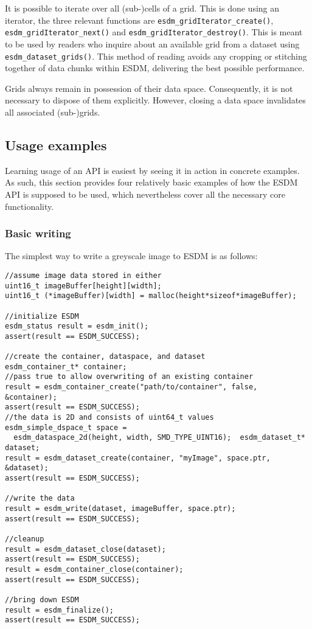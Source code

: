 It is possible to iterate over all (sub-)cells of a grid. 
This is done using an iterator, the three relevant functions are \lstinline|esdm_gridIterator_create()|, \lstinline|esdm_gridIterator_next()| and \lstinline|esdm_gridIterator_destroy()|. 
This is meant to be used by readers who inquire about an available grid from a dataset using \lstinline|esdm_dataset_grids()|. 
This method of reading avoids any cropping or stitching together of data chunks within ESDM, delivering the best possible performance.

Grids always remain in possession of their data space. 
Consequently, it is not necessary to dispose of them explicitly. 
However, closing a data space invalidates all associated (sub-)grids.

\subsection{Usage examples}%
\label{sec:user-guides:usage-example}
Learning usage of an API is easiest by seeing it in action in concrete examples. 
As such, this section provides four relatively basic examples of how the ESDM API is supposed to be used, which nevertheless cover all the necessary core functionality.

\subsubsection{Basic writing}
The simplest way to write a greyscale image to ESDM is as follows:

\begin{lstlisting}
//assume image data stored in either
uint16_t imageBuffer[height][width];
uint16_t (*imageBuffer)[width] = malloc(height*sizeof*imageBuffer);

//initialize ESDM
esdm_status result = esdm_init();
assert(result == ESDM_SUCCESS);

//create the container, dataspace, and dataset
esdm_container_t* container;
//pass true to allow overwriting of an existing container
result = esdm_container_create("path/to/container", false, &container); 
assert(result == ESDM_SUCCESS);
//the data is 2D and consists of uint64_t values
esdm_simple_dspace_t space = 
  esdm_dataspace_2d(height, width, SMD_TYPE_UINT16);  esdm_dataset_t* dataset;
result = esdm_dataset_create(container, "myImage", space.ptr, &dataset);
assert(result == ESDM_SUCCESS);

//write the data
result = esdm_write(dataset, imageBuffer, space.ptr);
assert(result == ESDM_SUCCESS);

//cleanup
result = esdm_dataset_close(dataset);
assert(result == ESDM_SUCCESS);
result = esdm_container_close(container);
assert(result == ESDM_SUCCESS);

//bring down ESDM
result = esdm_finalize();
assert(result == ESDM_SUCCESS);
\end{lstlisting}

